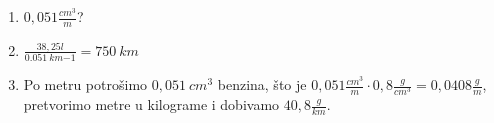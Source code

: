 

\begin{enumerate}[label=\alph*)]
  \item $0,051\frac{cm^3}{m}$?
  \item $\frac{38,25 l}{0.051\ km{-1}}=750\ km $
  \item Po metru potrošimo $0,051\ cm^3$ benzina, što je  $0,051\frac{cm^3}{m} \cdot0,8\frac{g}{cm^3}=0,0408\frac{g}{m}$, pretvorimo metre u kilograme i dobivamo $40,8\frac{g}{km}$.
 
\end{enumerate}
